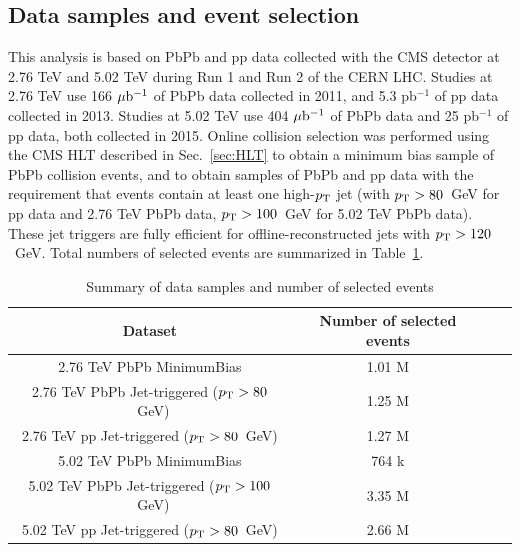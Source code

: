 \subsection{Data samples and event selection}

This analysis is based on PbPb and pp data collected with the CMS detector at 2.76 TeV and 5.02 TeV during Run 1 and Run 2 of the CERN LHC.  Studies at 2.76 TeV use 166 $\mu {\rm b}^{-1}$ of PbPb data collected in 2011, and 5.3 pb$^{-1}$ of pp data collected in 2013.  Studies at 5.02 TeV use 404 $\mu {\rm b}^{-1}$ of PbPb data and 25 pb$^{-1}$ of pp data, both collected in 2015.  Online collision selection was performed using the CMS HLT described in Sec.~\ref{sec:HLT} to obtain a minimum bias sample of PbPb collision events, and to obtain samples of PbPb and pp data with the requirement that events contain at least one high-$p_{\rm T}$ jet (with $p_{\rm T} > 80$~GeV for pp data and 2.76 TeV PbPb data, $p_{\rm T} > 100$~GeV for 5.02 TeV PbPb data).  These jet triggers are fully efficient for offline-reconstructed jets with $p_{\rm T} > 120$~GeV.  Total numbers of selected events are summarized in Table~\ref{table:evt_sel}.

\begin{table}[h!]
\begin{center} 
\caption{Summary of data samples and number of selected events}
\label{table:evt_sel} 
\begin{tabular}{|c|c|c|c|}
\hline
\hline
Dataset & Number of selected events  \\
\hline
\hline
2.76 TeV PbPb MinimumBias & 1.01 M \\
2.76 TeV PbPb Jet-triggered ($p_{\rm T} > 80$~GeV) & 1.25 M \\
2.76 TeV pp Jet-triggered ($p_{\rm T} > 80$~GeV) & 1.27 M \\
\hline
\hline
5.02 TeV PbPb MinimumBias & 764 k \\
5.02 TeV PbPb Jet-triggered ($p_{\rm T} > 100$~GeV) & 3.35 M \\
5.02 TeV pp Jet-triggered ($p_{\rm T} > 80$~GeV) & 2.66 M\\
\hline
\hline
\end{tabular}
\end{center} 
\end{table} 

